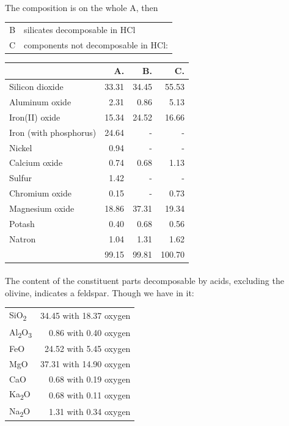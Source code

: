 \documentclass[a4paper, 12pt, oneside]{article}
\begin{document}
\paragraph*{}
The composition is on the whole A, then  
\begin{center}
    \begin{tabular}{r l}
        B & silicates decomposable in HCl\\
        C & components not decomposable in HCl:\\
    \end{tabular}
\end{center}
\begin{center}
    \begin{tabular}{ |l|r|r|r| }
        \hline
         & A. & B. & C.\\\hline
        Silicon dioxide & 33.31 & 34.45 & 55.53\\\hline
        Aluminum oxide & 2.31 & 0.86 & 5.13\\\hline
        Iron(II) oxide & 15.34 & 24.52 & 16.66\\\hline
        Iron (with phosphorus) & 24.64 & - & -\\\hline
        Nickel & 0.94 & - & -\\\hline
        Calcium oxide & 0.74 & 0.68 & 1.13\\\hline
        Sulfur & 1.42 & - & -\\\hline
        Chromium oxide & 0.15 & - & 0.73\\\hline
        Magnesium oxide & 18.86 & 37.31 & 19.34\\\hline
        Potash & 0.40 & 0.68 & 0.56\\\hline
        Natron & 1.04 & 1.31 & 1.62\\\hline
         & 99.15 & 99.81 & 100.70\\
        \hline
    \end{tabular}
\end{center}
\paragraph*{}
The content of the constituent parts decomposable by acids, excluding the olivine, indicates a feldspar. Though we have in it:
\begin{center}
    \begin{tabular}{l r}
        SiO\textsubscript{2} & 34.45 with 18.37 oxygen\\
        Al\textsubscript{2}O\textsubscript{3} & 0.86 with 0.40 oxygen\\
        FeO & 24.52 with 5.45 oxygen\\
        MgO & 37.31 with 14.90 oxygen\\
        CaO & 0.68 with 0.19 oxygen\\
        Ka\textsubscript{2}O & 0.68 with 0.11 oxygen\\
        Na\textsubscript{2}O & 1.31 with 0.34 oxygen\\
    \end{tabular}
\end{center}
\end{document}
